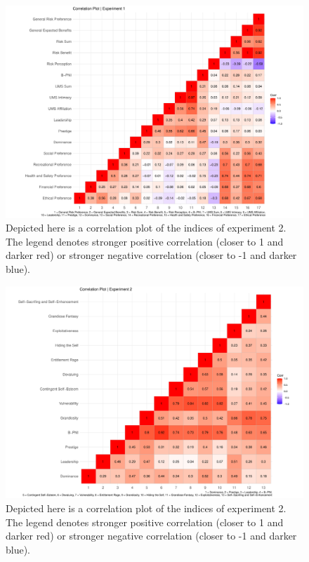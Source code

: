 \documentclass[
  donotrepeattitle,doc, 12pt, a4paper,floatsintext]{apa7}
\begin{document}
\begin{landscape}
\begin{figure}

{\centering \includegraphics{Output_Files/DoPL-Experiment_files/figure-latex/correlationExperiment1-1} 

}

\caption{Depicted here is a correlation plot of the indices of experiment 2. The legend denotes stronger positive correlation (closer to 1 and darker red) or stronger negative correlation (closer to -1 and darker blue).}\label{fig:correlationExperiment1}
\end{figure}
\newpage
\begin{figure}

{\centering \includegraphics{Output_Files/DoPL-Experiment_files/figure-latex/correlationExperiment2-1} 

}

\caption{Depicted here is a correlation plot of the indices of experiment 2. The legend denotes stronger positive correlation (closer to 1 and darker red) or stronger negative correlation (closer to -1 and darker blue).}\label{fig:correlationExperiment2}
\end{figure}
\end{landscape}
\end{document}
